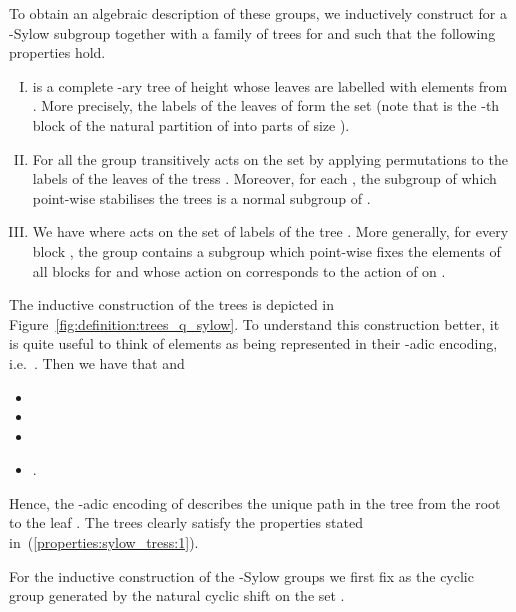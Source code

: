 \documentclass[a4paper,UKenglish]{lipics}
\theoremstyle{plain}
\begin{document}
To obtain an algebraic description of these groups, we inductively 
construct for  a -Sylow subgroup  together 
with a family of trees  for  
and  such that the following properties
hold.
\begin{enumerate}[(I)]
 \item  is a complete -ary tree of height  whose leaves 
are labelled with elements from .
 More precisely, the labels of the leaves of  form the set 
 (note that 
 is the -th block of the natural partition of  into 
parts of size ).
\label{properties:sylow_tress:1}
 \item For all  the group  transitively acts on the set  by applying
permutations  to the labels of the leaves of the tress 
.
Moreover, for each , the subgroup of  which point-wise 
stabilises the trees  is a normal subgroup of .
\label{properties:sylow_tress:2}
 \item We have  where 
 acts on the set of labels  of the tree 
. More generally, for every block , the group 
contains a subgroup  which point-wise fixes
the elements of all blocks  for  and whose action on
 corresponds to the action of  on .
\label{properties:sylow_tress:3}
\end{enumerate}


The inductive construction of the trees  is depicted in
Figure~\ref{fig:definition:trees_q_sylow}. 
To understand this construction better, it is quite
useful to think of elements  as being represented in their 
-adic encoding, i.e.\
. 
Then we have that  and
\begin{itemize}
 \item  
 \item 
 \item 
 \item .
\end{itemize}
Hence, the -adic encoding of  describes the unique path in the tree 
 from the root to the leaf .
The trees  clearly satisfy the properties stated
in~(\ref{properties:sylow_tress:1}).

For the inductive construction of the -Sylow groups
 we first fix  as the cyclic group generated by the natural 
cyclic shift  on the set .
\end{document}
